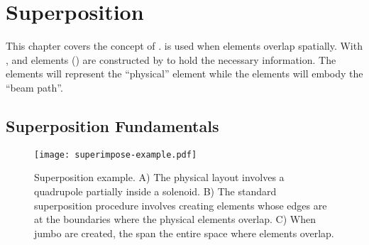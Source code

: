 \chapter{Superposition}
\label{c:super}

This chapter covers the concept of .   is used when elements
overlap spatially.  With ,  and  elements ()
are constructed by \bmad to hold the necessary information. The  elements will represent
the ``physical'' element while the  elements will embody the ``beam path''.

\section{Superposition Fundamentals}
\label{c:super.fund}

  \begin{figure}[tb]
  \centering 
  \texttt{[image: superimpose-example.pdf]} 
  \caption[Superposition example.]
{Superposition example. A) The physical layout involves a quadrupole partially inside a solenoid. B)
The standard superposition procedure involves creating  elements whose edges are at
the boundaries where the physical elements overlap. C) When jumbo  are created, the
 span the entire space where elements overlap.}
  \label{f:super.ex}
  \end{figure}

